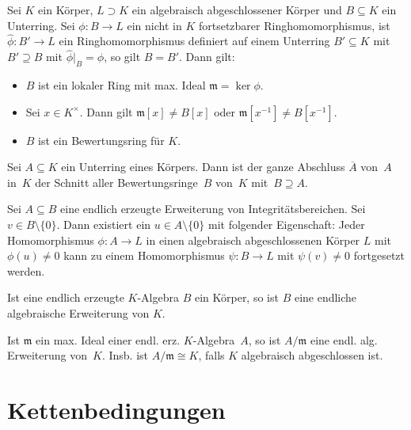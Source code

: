 \documentclass{cheat-sheet}
\newcommand{\mmm}{\mathfrak{m}}
\begin{document}
\begin{satz}
  Sei $K$ ein Körper, $L \supset K$ ein algebraisch abgeschlossener Körper und $B \subseteq K$ ein Unterring.
  Sei $\phi : B \to L$ ein nicht in $K$ fortsetzbarer Ringhomomorphismus, \dh{} ist $\hat{\phi} : B' \to L$ ein Ringhomomorphismus definiert auf einem Unterring $B' \subseteq K$ mit $B' \supseteq B$ mit $\hat{\phi}|_{B} = \phi$, so gilt $B = B'$.
  Dann gilt:
  \begin{itemize}
    \item $B$ ist ein lokaler Ring mit max. Ideal $\mmm = \ker \phi$.
    \item Sei $x \in K^{\times}$.
    Dann gilt $\mmm[x] \neq B[x]$ oder $\mmm[x^{-1}] \neq B[x^{-1}]$.
    \item $B$ ist ein Bewertungsring für $K$.
  \end{itemize}
\end{satz}

\begin{kor}
  Sei $A \subseteq K$ ein Unterring eines Körpers.
  Dann ist der ganze Abschluss $\overline{A}$ von~$A$ in~$K$ der Schnitt aller Bewertungsringe~$B$ von~$K$ mit~$B \supseteq A$.
\end{kor}

\begin{prop}
  Sei $A \subseteq B$ eine endlich erzeugte Erweiterung von Integritätsbereichen.
  Sei $v \in B \setminus \{ 0 \}$.
  Dann existiert ein $u \in A \setminus \{ 0 \}$ mit folgender Eigenschaft:
  Jeder Homomorphismus $\phi : A \to L$ in einen algebraisch abgeschlossenen Körper $L$ mit $\phi(u) \neq 0$ kann zu einem Homomorphismus $\psi : B \to L$ mit $\psi(v) \neq 0$ fortgesetzt werden.
\end{prop}


\begin{kor}
  Ist eine endlich erzeugte $K$-Algebra $B$ ein Körper, so ist $B$ eine endliche algebraische Erweiterung von $K$.
\end{kor}

\begin{kor}
  Ist $\mmm$ ein max. Ideal einer endl. erz. $K$-Algebra~$A$, so ist $A/\mmm$ eine endl. alg. Erweiterung von~$K$.
  Insb. ist $A/\mmm \cong K$, falls $K$ algebraisch abgeschlossen ist.
\end{kor}

\section{Kettenbedingungen}
\end{document}
